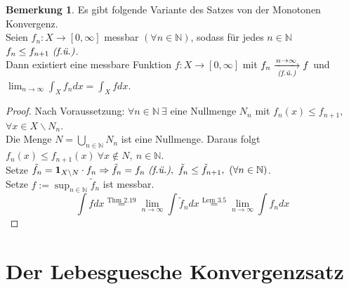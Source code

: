 \documentclass[a4paper]{report}
\newcommand{\doubleOne}{\textbf{1}}
\newcommand{\N}{\mathbb{N}}
\newcommand{\toInf}{\rightarrow \infty}
\newcommand{\limToInf}[1]{\lim_{#1 \toInf}}
\newcommand{\jlabel}[1]{\label{j_#1}}
\newcommand{\jshortlink}[1]{\jhyperref{#1}{\text{#1}}}
\newcommand{\jhyperref}[2]{\hyperref[j_#1]{#2}}
\newcommand{\fu}{\text{\textit{(f.ü.)}}}
\newcommand{\jabb}[3]{ #1: #2 \rightarrow #3 }
\theoremstyle{plain}
\theoremstyle{definition}
\newtheorem{bem}[thm]{Bemerkung}
\begin{document}
{{{{\begin{bem}
\jlabel{Bem 3.8}
    Es gibt folgende Variante des Satzes von der Monotonen Konvergenz.\\
    Seien $\jabb{f_n}{X}{[0,\infty]}$ messbar $(\forall n\in\N)$, sodass für jedes $n\in \N$ $f_n \le f_{n+1} \ \fu$.\\
    Dann existiert eine messbare Funktion $\jabb{f}{X}{[0,\infty]}$ mit $f_n \underset{\fu}{\xrightarrow{n\rightarrow \infty}} f$ und $\limToInf{n} \int_X f_n dx = \int_X f dx$.
    \begin{proof}
        Nach Voraussetzung: $\forall n\in\N \ \exists$ eine Nullmenge $N_n$ mit $f_n(x) \le f_{n+1},$ $\forall x \in X\backslash N_n$.\\
        Die Menge $N=\bigcup_{n\in\N} N_n$ ist eine Nullmenge. Daraus folgt $f_n(x) \le f_{n+1}(x) \ \forall x\notin N, \ n\in\N$.\\
        Setze $\tilde{f}_n = \doubleOne_{X\backslash N} \cdot f_n \Rightarrow \tilde{f}_n = f_n \ \fu, \ \tilde{f}_n \le \tilde{f}_{n+1}, \ (\forall n\in\N)$.\\
        Setze $f := \sup_{n\in\N} \tilde{f}_n$ ist messbar.
        \begin{displaymath}
            \int f dx \overset{\jshortlink{Thm 2.19}}{=} \limToInf{n} \int \tilde{f}_n dx \overset{\jshortlink{Lem 3.5}}{=} \limToInf{n} \int f_n dx
        \end{displaymath}
    \end{proof}
\end{bem}
    
\section{Der Lebesguesche Konvergenzsatz}

}}}}
\end{document}
